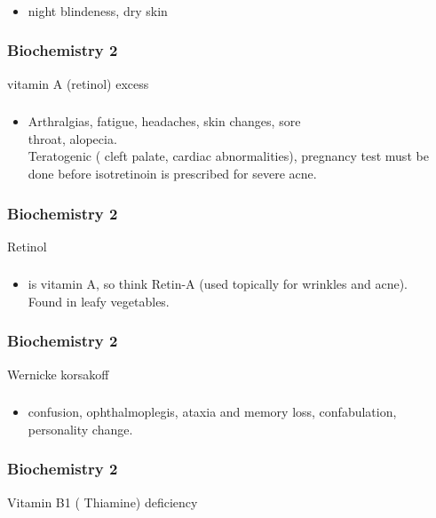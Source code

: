 \documentclass[11pt]{beamer}
\begin{document}
\begin{frame}
 \frametitle{}
\begin{itemize}
\item night blindeness, dry skin
\end{itemize}
\end{frame}

\begin{frame}
 \frametitle{Biochemistry 2}
vitamin A (retinol) excess  
\end{frame}

\begin{frame}
 \frametitle{}
\begin{itemize}
\item Arthralgias, fatigue, headaches, skin changes, sore \\ throat, alopecia. \\ Teratogenic ( cleft palate, cardiac abnormalities), pregnancy test must be done before isotretinoin is prescribed for severe acne. 
\end{itemize}
\end{frame}

\begin{frame}
 \frametitle{Biochemistry 2}
Retinol
\end{frame}

\begin{frame}
 \frametitle{}
\begin{itemize}
\item is vitamin A, so think Retin-A (used topically for wrinkles and acne). \\ Found in leafy vegetables.
\end{itemize}
\end{frame}

\begin{frame}
 \frametitle{Biochemistry 2}
Wernicke korsakoff 
\end{frame}

\begin{frame}
 \frametitle{}
\begin{itemize}
\item confusion, ophthalmoplegis, ataxia and memory loss, confabulation, personality change. 
\end{itemize}
\end{frame}

\begin{frame}
 \frametitle{Biochemistry 2}
Vitamin B1 ( Thiamine) deficiency 
\end{frame}
\end{document}
